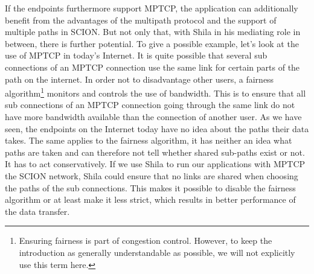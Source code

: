 If the endpoints furthermore support MPTCP, the application can additionally benefit from the advantages of the multipath protocol and the support of multiple paths in SCION. But not only that, with Shila in his mediating role in between, there is further potential. To give a possible example, let's look at the use of MPTCP in today's Internet. It is quite possible that several sub connections of an MPTCP connection use the same link for certain parts of the path on the internet. In order not to disadvantage other users, a fairness algorithm\footnote{Ensuring fairness is part of congestion control. However, to keep the introduction as generally understandable as possible, we will not explicitly use this term here.} monitors and controls the use of bandwidth. This is to ensure that all sub connections of an MPTCP connection going through the same link do not have more bandwidth available than the connection of another user. As we have seen, the endpoints on the Internet today have no idea about the paths their data takes. The same applies to the fairness algorithm, it has neither an idea what paths are taken and can therefore not tell whether shared sub-paths exist or not. It has to act conservatively. If we use Shila to run our applications with MPTCP the SCION network, Shila could ensure that no links are shared when choosing the paths of the sub connections. This makes it possible to disable the fairness algorithm or at least make it less strict, which results in better performance of the data transfer.